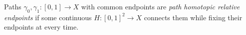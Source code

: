 
Paths $\gamma_0,\gamma_1:[0,1]\to X$ with common endpoints are \emph{path homotopic relative endpoints} if some continuous $H:[0,1]^2\to X$ connects them while fixing their endpoints at every time.
